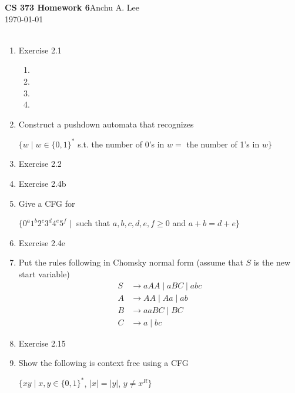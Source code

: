 \documentclass{article}
\begin{document}
    \noindent\textbf{CS 373 Homework 6}\hfill Anchu A. Lee\\
    \noindent\today\\\\
    \begin{enumerate}
        \item Exercise 2.1
            \begin{enumerate}[label =\alph*.]
                \item 
                \item 
                \item 
                \item 
            \end{enumerate}
        
        \item Construct a pushdown automata that recognizes 
            \begin{center}
                $\{w\mid w \in \{0,1\}^* $ s.t. the number of 0's in $ w = $ the number of 1's in $ w \}$
            \end{center}
        
        \item Exercise 2.2

        \item Exercise 2.4b

        \item Give a CFG for
            \begin{center}
                $\{0^a1^b2^c3^d4^e5^f \mid $ such that $ a,b,c,d,e,f\geq 0 $ and $ a+b=d+e \}$
            \end{center}
        
        \item Exercise 2.4e

        \item Put the rules following in Chomsky normal form (assume that $S$ is the new start variable)
            \begin{align*}
                S&\rightarrow aAA \mid aBC \mid abc\\
                A&\rightarrow AA \mid Aa \mid ab\\
                B&\rightarrow aaBC \mid BC\\
                C&\rightarrow a\mid bc
            \end{align*}
        
        \item Exercise 2.15

        \item Show the following is context free using a CFG
            \begin{center}
                $\{xy \mid x,y\in \{0,1\}^*$, $ |x|=|y|$, $ y\not= x^R\}$
            \end{center}


\end{enumerate}
\end{document}
